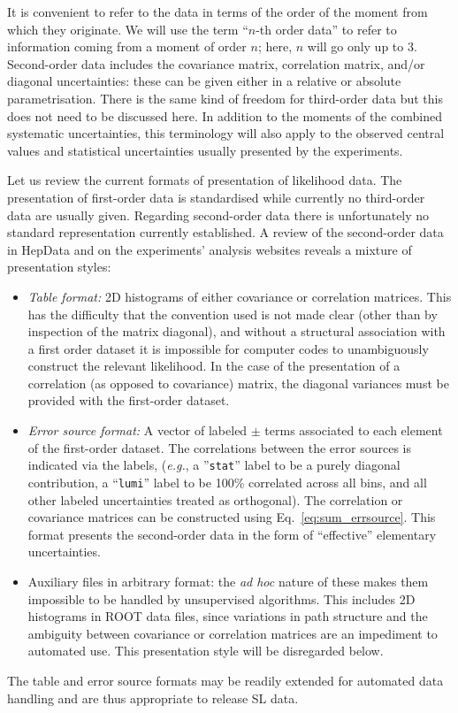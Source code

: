 \documentclass[11pt]{article}
\def\eg{{\it e.g.}}
\begin{document}
It is convenient to refer to the data in terms of
the order of the moment from which they originate. We will use the term ``$n$-th
order data'' to refer to information coming from a moment of order $n$; here, $n$
will go only up to $3$. Second-order data includes the covariance matrix,
correlation matrix, and/or diagonal uncertainties: these can be given either in a
relative or absolute parametrisation. There is the same kind of freedom for
third-order data but this does not need to be discussed here. In addition to the
moments of the combined systematic uncertainties, this terminology will also
apply to the observed central values and statistical uncertainties usually
presented by the experiments.

Let us review the current formats of presentation of likelihood data. The presentation
of first-order data is standardised while currently no third-order data are usually given.
Regarding second-order data there is unfortunately no standard representation
currently established.  A review of the second-order data in HepData 
and on the experiments' analysis websites reveals a
mixture of presentation styles:
%
\begin{itemize}
\item \textit{Table format:} 2D histograms of either covariance or correlation
  matrices. This has the difficulty that the convention used is not made clear
  (other than by inspection of the matrix diagonal), and without a structural
  association with a first order dataset it is impossible for computer codes to
  unambiguously construct the relevant likelihood. In the case of the
  presentation of a correlation (as opposed to covariance) matrix, the diagonal
  variances must be provided with the first-order dataset.

\item \textit{Error source format:} A vector of labeled $\pm$ terms associated
  to each element of the first-order dataset. The correlations between the error
  sources is indicated via the labels, (\eg, a ''\texttt{stat}'' label to be a
  purely diagonal contribution, a ``\texttt{lumi}'' label to be 100\% correlated
  across all bins, and all other labeled uncertainties treated as orthogonal).
  The correlation or covariance matrices can be constructed using Eq.~\eqref{eq:sum_errsource}.
  This format presents the second-order data in the form of ``effective''
  elementary uncertainties.

\item Auxiliary files in arbitrary format: the \emph{ad hoc} nature of these
  makes them impossible to be handled by unsupervised algorithms. This includes
  2D histograms in ROOT data files, since variations in path structure and the
  ambiguity between covariance or correlation matrices are an impediment to
  automated use. This presentation style will be disregarded below.
\end{itemize}
%
The table and error source formats  may be readily extended for automated data
handling and are thus appropriate to release SL data.
\end{document}
